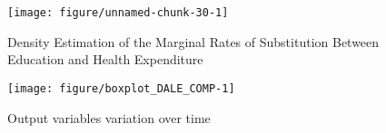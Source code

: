 \documentclass[12pt,a4paper]{article}\usepackage[]{graphicx}\usepackage[]{color}
\newenvironment{knitrout}{}{} %
\begin{document}
\begin{knitrout}
\color{fgcolor}\begin{figure}[htbp]

{\centering \texttt{[image: figure/unnamed-chunk-30-1]} 

}

\caption[Density Estimation of the Marginal Rates of Substitution Between Education and Health Expenditure]{Density Estimation of the Marginal Rates of Substitution Between Education and Health Expenditure}\label{fig:unnamed-chunk-30}
\end{figure}


\end{knitrout}

\begin{knitrout}
\color{fgcolor}\begin{figure}[htbp]

{\centering \texttt{[image: figure/boxplot\_DALE\_COMP-1]} 

}

\caption[Output variables variation over time]{Output variables variation over time}\label{fig:boxplot_DALE_COMP}
\end{figure}


\end{knitrout}




\end{document}
